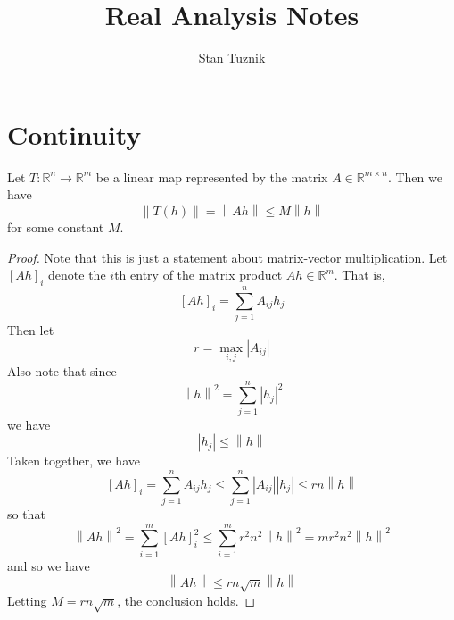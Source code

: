 
\title{Real Analysis Notes}
\author{Stan Tuznik}




\maketitle
\tableofcontents







\chapter{Continuity}



\begin{prop}
Let $T: \mathbb{R}^n \rightarrow \mathbb{R}^m$ be a linear map represented by the matrix $A \in \mathbb{R}^{m \times n}$. Then we have \[ \left\lVert T\left(h\right) \right\rVert = \left\lVert Ah \right\rVert  \leq M \left\lVert h \right\rVert \] for some constant $M$.
\end{prop}
\begin{proof}
Note that this is just a statement about matrix-vector multiplication. Let $\left[ Ah \right]_i$ denote the $i$th entry of the matrix product $Ah \in \mathbb{R}^m$. That is, \[ \left[Ah\right]_i = \sum_{j=1}^n A_{ij}h_j \] Then let \[ r = \max_{i,j} \left| A_{ij} \right| \] Also note that since \[ \left\lVert h \right\rVert^2 = \sum_{j=1}^n \left| h_j \right|^2 \] we have \[ \left| h_j \right| \leq \left\lVert h \right\rVert \] Taken together, we have \[ \left[ Ah\right]_i = \sum_{j=1}^n A_{ij} h_j \leq \sum_{j=1}^n \left| A_{ij} \right| \left| h_j \right| \leq rn\left\lVert h \right\rVert \] so that \[ \left\lVert Ah\right\rVert^2 = \sum_{i=1}^m \left[Ah\right]_i^2 \leq \sum_{i=1}^m r^2n^2 \left\lVert h\right\rVert^2 = mr^2n^2 \left\lVert h\right\rVert^2 \] and so we have \[ \left\lVert Ah\right\rVert \leq rn\sqrt{m}\left\lVert h \right\rVert \] Letting $M = rn\sqrt{m}$, the conclusion holds.
\end{proof}


